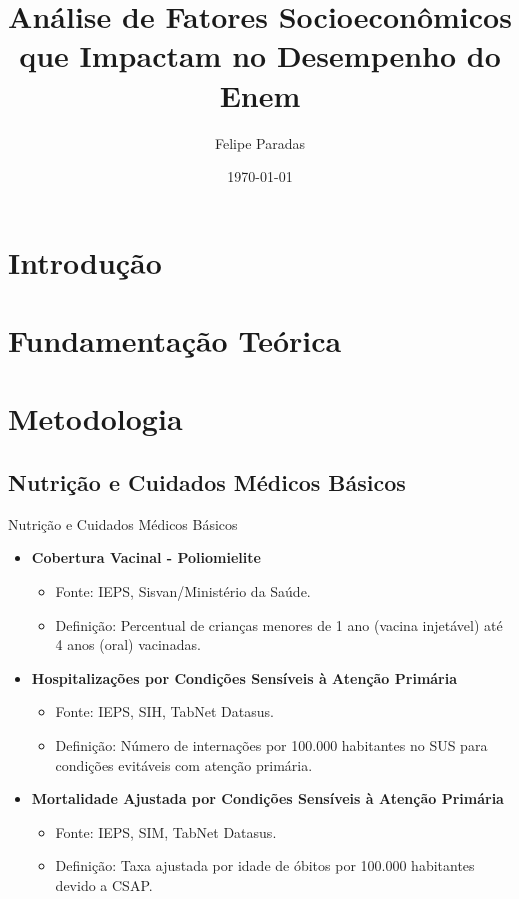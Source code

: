 \documentclass{beamer}
\title{Análise de Fatores Socioeconômicos que Impactam no Desempenho do Enem}
\author{Felipe Paradas}
\date{\today}
\begin{document}
\frame{\titlepage}

\section{Introdução}

\section{Fundamentação Teórica}

\section{Metodologia}

\subsection{Nutrição e Cuidados Médicos Básicos}
\begin{frame}{Nutrição e Cuidados Médicos Básicos}
\begin{itemize}
    \item \textbf{Cobertura Vacinal - Poliomielite}
    \begin{itemize}
        \item Fonte: IEPS, Sisvan/Ministério da Saúde.
        \item Definição: Percentual de crianças menores de 1 ano (vacina injetável) até 4 anos (oral) vacinadas.
    \end{itemize}
    \item \textbf{Hospitalizações por Condições Sensíveis à Atenção Primária}
    \begin{itemize}
        \item Fonte: IEPS, SIH, TabNet Datasus.
        \item Definição: Número de internações por 100.000 habitantes no SUS para condições evitáveis com atenção primária.
    \end{itemize}
    \item \textbf{Mortalidade Ajustada por Condições Sensíveis à Atenção Primária}
    \begin{itemize}
        \item Fonte: IEPS, SIM, TabNet Datasus.
        \item Definição: Taxa ajustada por idade de óbitos por 100.000 habitantes devido a CSAP.
    \end{itemize}
\end{itemize}
\end{frame}
\end{document}

